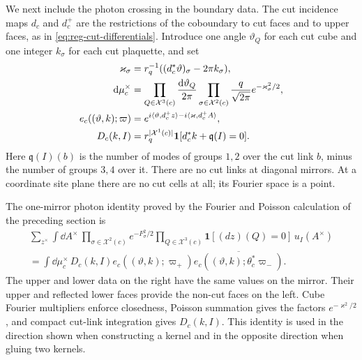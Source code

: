 We next include the photon crossing in the boundary data. The cut
incidence maps $d_c$ and $d_c^+$ are the restrictions of the coboundary
to cut faces and to upper faces, as in
\eqref{eq:reg-cut-differentials}. Introduce one angle $\vartheta_Q$
for each cut cube and one integer $k_\sigma$ for each cut plaquette,
and set
\begin{align}\label{eq:slab-dual-measure}
 \varkappa_\sigma&=r_q^{-1}
       ((d_c^*\vartheta)_\sigma-2\pi k_\sigma),\notag\\
 \mathrm d\mu_c^\times&=
      \prod_{Q\in\mathcal X^3(c)}\frac{\mathrm d\vartheta_Q}{2\pi}
      \prod_{\sigma\in\mathcal X^2(c)}
                     \frac{q}{\sqrt{2\pi}}e^{-\varkappa_\sigma^2/2},\\
 e_c((\vartheta,k);\varpi)&=
       e^{i\langle\vartheta,d_c^+z\rangle
                             -i\langle\varkappa,d_c^+A\rangle},\notag\\
 D_c(k,I)&=r_q^{|\mathcal X^1(c)|}
       \mathbf1[d_c^*k+\mathfrak q(I)=0].\notag
\end{align}
Here $\mathfrak q(I)(b)$ is the number of modes of groups $1,2$ over
the cut link $b$, minus the number of groups $3,4$ over it. There are
no cut links at diagonal mirrors. At a coordinate site plane there
are no cut cells at all; its Fourier space is a point.

The one-mirror photon identity proved by the Fourier and Poisson
calculation of the preceding section is
\begin{multline}\label{eq:slab-photon-gluing}
 \sum_{z^\times}\int\dd A^\times\,
       \prod_{\sigma\in\mathcal X^2(c)}e^{-F_\sigma^2/2}
       \prod_{Q\in\mathcal X^3(c)}\mathbf1[(dz)(Q)=0]\,u_I(A^\times)
       \\
 =\int\dd\mu_c^\times\,D_c(k,I)
           e_c((\vartheta,k);\varpi_+)
            \overline{e_c((\vartheta,k);\theta_c^*\varpi_-)}.
\end{multline}
The upper and lower data on the right have the same values on the
mirror. Their upper and reflected lower faces provide the non-cut
faces on the left. Cube Fourier multipliers enforce closedness,
Poisson summation gives the factors $e^{-\varkappa^2/2}$, and compact
cut-link integration gives $D_c(k,I)$. This identity is used in the
direction shown when constructing a kernel and in the opposite
direction when gluing two kernels.

